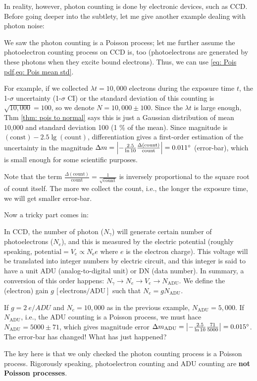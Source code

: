 In reality, however, photon counting is done by electronic devices, such as CCD. Before going deeper into the subtlety, let me give another example dealing with photon noise:

\begin{ex} \label{ex: poisnoise}
We saw the photon counting is a Poisson process; let me further assume the photoelectron counting process on CCD is, too (photoelectrons are generated by these photons when they excite bound electrons). Thus, we can use \cref{eq: Pois pdf,eq: Pois mean std}. 

For example, if we collected $ \lambda t = 10,000 $ electrons during the exposure time $ t $, the 1-$ \sigma $ uncertainty (1-$ \sigma $ CI) or the standard deviation of this counting is $ \sqrt{10,000} = 100 $, so we denote $ N = 10,000 \pm 100 $. Since the $ \lambda t $ is large enough, Thm \ref{thm: pois to normal} says this is just a Gaussian distribution of mean 10,000 and standard deviation 100 (1 \% of the mean). Since magnitude is $ (\mathrm{const}) - 2.5 \lg (\mathrm{count}) $, differentiation gives a first-order estimation of the uncertainty in the magnitude $ \Delta m = \qty | -\frac{2.5}{\ln 10} \frac{\Delta (\mathrm{count})}{\mathrm{count}} | = \m{0.011} $ (error-bar), which is small enough for some scientific purposes. 

Note that the term $ \frac{\Delta (\mathrm{count})}{\mathrm{count}} = \frac{1}{\sqrt{\mathrm{count}}} $ is inversely proportional to the square root of count itself. The more we collect the count, i.e., the longer the exposure time, we will get smaller error-bar.
\end{ex}

Now a tricky part comes in:
\begin{ex} \label{ex: poisnoise adu}
In CCD, the number of photon ($ N_\gamma $) will generate certain number of photoelectrons ($ N_e $), and this is measured by the electric potential (roughly speaking, $ \mathrm{potential} = V_e \propto N_\mathrm{e} e $ where $ e $ is the electron charge). This voltage will be translated into integer numbers by electric circuit, and this integer is said to have a unit ADU (analog-to-digital unit) or DN (data number). In summary, a conversion of this order happens: $ N_\gamma \rightarrow N_e \rightarrow V_e \rightarrow N_\mathrm{ADU} $. We define the (electron) gain $ g \,[\mathrm{electrons/ADU}] $ such that $ N_e = g N_\mathrm{ADU} $. 

If $ g = \SI{2}{e/ADU} $ and $ N_e = 10,000 $ as in the previous example, $ N_\mathrm{ADU} = 5,000 $. If $ N_\mathrm{ADU} $, i.e., the ADU counting is a Poisson process, we must hace $ N_\mathrm{ADU} = 5000 \pm 71 $, which gives magnitude error $ \Delta m_\mathrm{ADU} = \qty | -\frac{2.5}{\ln 10} \frac{71}{5000} | = \m{0.015} $. The error-bar has changed! What has just happened?

The key here is that we only checked the photon counting process is a Poisson process. Rigorously speaking, photoelectron counting and ADU counting are \textbf{not Poisson processes}.
\end{ex}

